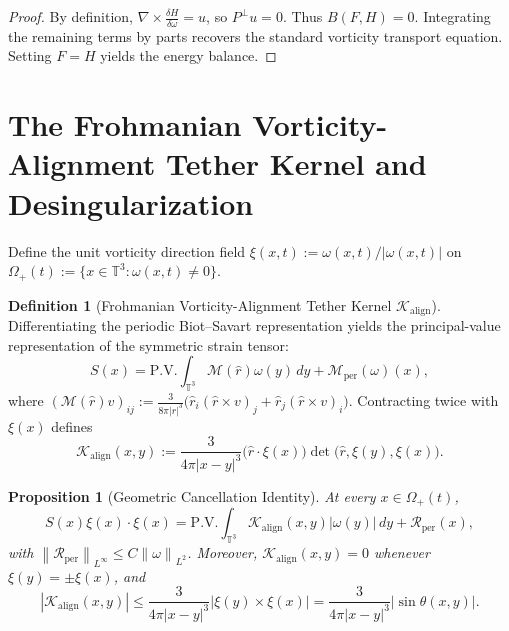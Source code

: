 \documentclass[11pt,reqno]{amsart}
\newtheorem{proposition}[theorem]{Proposition}
\theoremstyle{definition}
\newtheorem{definition}[theorem]{Definition}
\newcommand{\T}{\mathbb{T}^3}
\newcommand{\Pperp}{P^\perp}
\newcommand{\norm}[1]{\left\| #1 \right\|}
\newcommand{\abs}[1]{\left| #1 \right|}
\begin{document}
\begin{proof}
By definition, $\nabla \times \frac{\delta H}{\delta \omega} = u$, so $\Pperp u = 0$. Thus $B(F, H) = 0$. Integrating the remaining terms by parts recovers the standard vorticity transport equation. Setting $F = H$ yields the energy balance.
\end{proof}

\section{The Frohmanian Vorticity-Alignment Tether Kernel and Desingularization}

Define the unit vorticity direction field $\xi(x,t) := \omega(x,t) / \abs{\omega(x,t)}$ on $\Omega_+(t) := \{ x \in \T : \omega(x,t) \neq 0 \}$.

\begin{definition}[Frohmanian Vorticity-Alignment Tether Kernel $\mathcal{K}_{\mathrm{align}}$]\label{def:align_kernel}
Differentiating the periodic Biot--Savart representation yields the principal-value representation of the symmetric strain tensor:
\begin{equation}\label{eq:strain_BS}
S(x) = \mathrm{P.V.} \int_{\T} \mathcal{M}(\widehat{r}) \omega(y) \, dy + \mathcal{M}_{\mathrm{per}}(\omega)(x),
\end{equation}
where $\left(\mathcal{M}(\widehat{r}) v\right)_{ij} := \frac{3}{8\pi \abs{r}^3} \bigl( \widehat{r}_i (\widehat{r} \times v)_j + \widehat{r}_j (\widehat{r} \times v)_i \bigr)$. Contracting twice with $\xi(x)$ defines
\begin{equation}\label{eq:tether_align_kernel}
\mathcal{K}_{\mathrm{align}}(x, y) := \frac{3}{4\pi \abs{x - y}^3} \bigl( \widehat{r} \cdot \xi(x) \bigr) \det\bigl( \widehat{r}, \xi(y), \xi(x) \bigr).
\end{equation}
\end{definition}

\begin{proposition}[Geometric Cancellation Identity]\label{prop:geom_cancellation}
At every $x \in \Omega_+(t)$,
\begin{equation}\label{eq:stretching_decomp}
S(x)\xi(x) \cdot \xi(x) = \mathrm{P.V.} \int_{\T} \mathcal{K}_{\mathrm{align}}(x, y) \abs{\omega(y)} \, dy + \mathcal{R}_{\mathrm{per}}(x),
\end{equation}
with $\norm{\mathcal{R}_{\mathrm{per}}}_{L^\infty} \le C \norm{\omega}_{L^2}$. Moreover, $\mathcal{K}_{\mathrm{align}}(x, y) = 0$ whenever $\xi(y) = \pm \xi(x)$, and
\begin{equation}\label{eq:kernel_bound}
\abs{\mathcal{K}_{\mathrm{align}}(x, y)} \le \frac{3}{4\pi \abs{x - y}^3} \abs{\xi(y) \times \xi(x)} = \frac{3}{4\pi \abs{x - y}^3} \abs{\sin \theta(x, y)}.
\end{equation}
\end{proposition}
\end{document}
